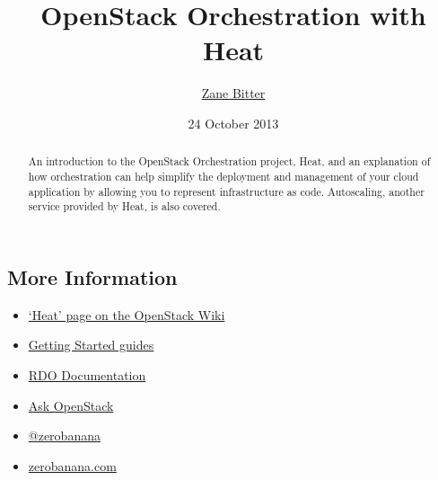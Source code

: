 \documentclass{tufte-handout}
\title{OpenStack Orchestration with Heat}
\author{\href{mailto:zbitter@redhat.com}{Zane Bitter}}
\date{24 October 2013}
\begin{document}
\maketitle

\marginnote{\tableofcontents \vspace{2em}}

\begin{abstract}
An introduction to the OpenStack Orchestration project, Heat, and an explanation of how orchestration can help simplify the deployment and management of your cloud application by allowing you to represent infrastructure as code. Autoscaling, another service provided by Heat, is also covered.
\end{abstract}











\begin{marginfigure}
\section{More Information}
\begin{itemize}
\item \href{https://wiki.openstack.org/Heat}{`Heat' page on the OpenStack Wiki}
\item \href{http://docs.openstack.org/developer/heat/#getting-started}{Getting Started guides}
\item \href{http://openstack.redhat.com/Docs}{RDO Documentation}
\item \href{https://ask.openstack.org/}{Ask OpenStack}
\item \href{https://twitter.com/zerobanana}{@zerobanana}
\item \href{http://www.zerobanana.com/tags/OpenStack}{zerobanana.com}
\end{itemize}
\end{marginfigure}
\end{document}
